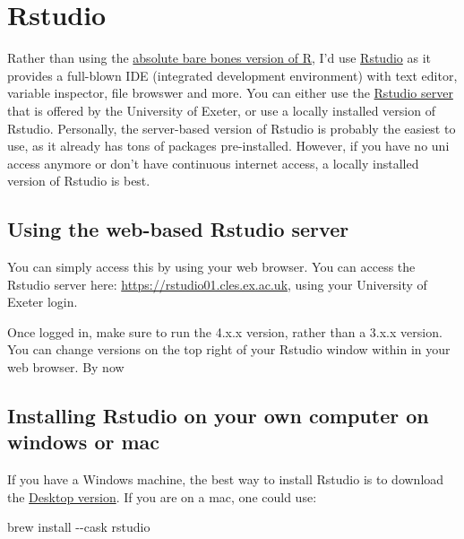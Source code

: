 \documentclass[
]{book}
\newenvironment{Shaded}{\begin{snugshade}}{\end{snugshade}}
\newcommand{\AttributeTok}[1]{\textcolor[rgb]{0.77,0.63,0.00}{#1}}
\newcommand{\ExtensionTok}[1]{#1}
\newcommand{\NormalTok}[1]{#1}
\begin{document}
\hypertarget{rstudio}{%
\section{Rstudio}\label{rstudio}}

Rather than using the \href{https://cran.r-project.org/}{absolute bare bones version of R}, I'd use \href{https://www.rstudio.com/}{Rstudio} as it provides a full-blown IDE (integrated development environment) with text editor, variable inspector, file browswer and more. You can either use the \href{https://rstudio01.cles.ex.ac.uk}{Rstudio server} that is offered by the University of Exeter, or use a locally installed version of Rstudio. Personally, the server-based version of Rstudio is probably the easiest to use, as it already has tons of packages pre-installed. However, if you have no uni access anymore or don't have continuous internet access, a locally installed version of Rstudio is best.

\hypertarget{using-the-web-based-rstudio-server}{%
\subsection{Using the web-based Rstudio server}\label{using-the-web-based-rstudio-server}}

You can simply access this by using your web browser. You can access the Rstudio server here:
\url{https://rstudio01.cles.ex.ac.uk}, using your University of Exeter login.

Once logged in, make sure to run the 4.x.x version, rather than a 3.x.x version. You can change versions on the top right of your Rstudio window within in your web browser. By now

\hypertarget{installing-rstudio-on-your-own-computer-on-windows-or-mac}{%
\subsection{Installing Rstudio on your own computer on windows or mac}\label{installing-rstudio-on-your-own-computer-on-windows-or-mac}}

If you have a Windows machine, the best way to install Rstudio is to download the \href{https://www.rstudio.com/products/rstudio/download/}{Desktop version}. If you are on a mac, one could use:

\begin{Shaded}
\begin{Highlighting}[]
\ExtensionTok{brew}\NormalTok{ install }\AttributeTok{{-}{-}cask}\NormalTok{ rstudio}
\end{Highlighting}
\end{Shaded}
\end{document}
